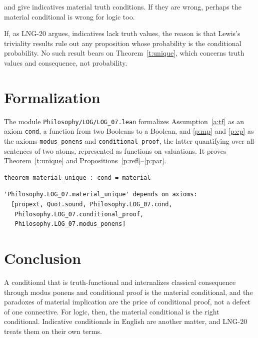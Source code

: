 \documentclass{situationist-preprint}
\begin{document}
\begin{objection}
\citet{Jackson1979} and \citet{Grice1989} give indicatives material truth conditions. If they are wrong, perhaps the material conditional is wrong for logic too.
\end{objection}

\begin{reply}
If, as LNG-20 argues, indicatives lack truth values, the reason is that Lewis's triviality results \citep{Lewis1976} rule out any proposition whose probability is the conditional probability. No such result bears on Theorem~\ref{t:unique}, which concerns truth values and consequence, not probability.
\end{reply}

\section{Formalization}

The module \nolinkurl{Philosophy/LOG/LOG_07.lean} formalizes Assumption~\ref{a:tf} as an axiom \texttt{cond}, a function from two Booleans to a Boolean, and \ref{p:mp} and \ref{p:cp} as the axioms \texttt{modus\_ponens} and \texttt{conditional\_proof}, the latter quantifying over all sentences of two atoms, represented as functions on valuations. It proves Theorem~\ref{t:unique} and Propositions~\ref{p:refl}--\ref{p:par}.

\begin{lstlisting}
theorem material_unique : cond = material
\end{lstlisting}

\begin{lstlisting}
'Philosophy.LOG_07.material_unique' depends on axioms:
  [propext, Quot.sound, Philosophy.LOG_07.cond,
   Philosophy.LOG_07.conditional_proof,
   Philosophy.LOG_07.modus_ponens]
\end{lstlisting}

\section{Conclusion}

A conditional that is truth-functional and internalizes classical consequence through modus ponens and conditional proof is the material conditional, and the paradoxes of material implication are the price of conditional proof, not a defect of one connective. For logic, then, the material conditional is the right conditional. Indicative conditionals in English are another matter, and LNG-20 treats them on their own terms.
\end{document}
